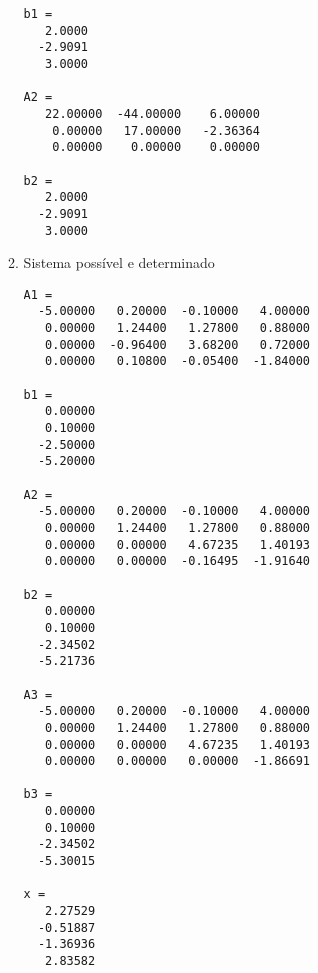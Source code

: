 \documentclass[a4paper]{article}
\begin{document}
\begin{enumerate}
\begin{enumerate}
\begin{verbatim}
b1 =
   2.0000
  -2.9091
   3.0000

A2 =
   22.00000  -44.00000    6.00000
    0.00000   17.00000   -2.36364
    0.00000    0.00000    0.00000

b2 =
   2.0000
  -2.9091
   3.0000
\end{verbatim}

  \item Sistema possível e determinado
\begin{verbatim}
A1 =
  -5.00000   0.20000  -0.10000   4.00000
   0.00000   1.24400   1.27800   0.88000
   0.00000  -0.96400   3.68200   0.72000
   0.00000   0.10800  -0.05400  -1.84000

b1 =
   0.00000
   0.10000
  -2.50000
  -5.20000

A2 =
  -5.00000   0.20000  -0.10000   4.00000
   0.00000   1.24400   1.27800   0.88000
   0.00000   0.00000   4.67235   1.40193
   0.00000   0.00000  -0.16495  -1.91640

b2 =
   0.00000
   0.10000
  -2.34502
  -5.21736

A3 =
  -5.00000   0.20000  -0.10000   4.00000
   0.00000   1.24400   1.27800   0.88000
   0.00000   0.00000   4.67235   1.40193
   0.00000   0.00000   0.00000  -1.86691

b3 =
   0.00000
   0.10000
  -2.34502
  -5.30015

x =
   2.27529
  -0.51887
  -1.36936
   2.83582
\end{verbatim}


\end{enumerate}
\end{enumerate}
\end{document}
